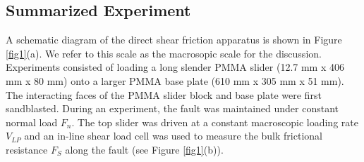 \documentclass[preprint,1p, 10pt,authoryear]{elsarticle}
\begin{document}
\subsection{Summarized Experiment}
\label{GeneralExp}
A schematic diagram of the direct shear friction apparatus is shown in Figure \ref{fig1}(a). We refer to this scale as the macrosopic scale for the discussion. Experiments consisted of loading a long slender PMMA slider (12.7 mm x 406 mm x 80 mm) onto a larger PMMA base plate (610 mm x 305 mm x 51 mm). The interacting faces of the PMMA slider block and base plate were first sandblasted. During an experiment, the fault was maintained under constant normal load $F_{n}$.  The top slider was driven at a constant macroscopic loading rate $V_{LP}$ and an in-line shear load cell was used to measure the bulk frictional resistance $F_{S}$ along the fault (see Figure \ref{fig1}(b)).   
  
\end{document}
